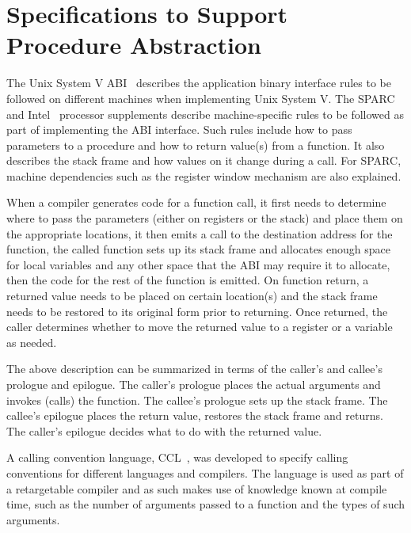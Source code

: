 \section{Specifications to Support Procedure Abstraction}
\label{sec-callConvSpec}

The Unix System V ABI~\cite{Unix90} describes the application
binary interface rules to be followed on different machines
when implementing Unix System V.  The SPARC~\cite{Unix90b} and
Intel~\cite{Unix90c} processor supplements describe machine-specific
rules to be followed as part of implementing the ABI interface.
Such rules include how to pass parameters to a procedure and how
to return value(s) from a function.  It also describes  the stack
frame and how values on it change during a call.  For SPARC,
machine dependencies such as the register window mechanism are
also explained.

When a compiler generates code for a function call, it first needs
to determine where to pass the parameters (either on registers
or the stack) and place them on the appropriate locations, it
then emits a call to the destination address for the function,
the called function sets up its stack frame and allocates enough
space for local variables and any other space that the ABI may
require it to allocate, then the code for the rest of the function
is emitted.  On function return, a returned value needs to be placed
on certain location(s) and the stack frame needs to be restored to
its original form prior to returning.  Once returned, the caller
determines whether to move the returned value to a register or a
variable as needed.

The above description can be summarized in terms of the caller's
and callee's prologue and epilogue.  The caller's prologue places
the actual arguments and invokes (calls) the function.  The callee's
prologue sets up the stack frame.  The callee's epilogue places the
return value, restores the stack frame and returns.  The caller's
epilogue decides what to do with the returned value.

A calling convention language, CCL~\cite{Bail95}, was developed to
specify calling conventions for different languages and compilers.
The language is used as part of a retargetable compiler and as such
makes use of knowledge known at compile time, such as the number
of arguments passed to a function and the types of such arguments.

